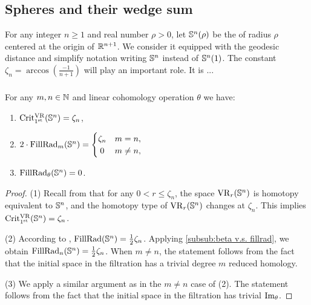 
\subsection{Spheres and their wedge sum }\label{ss:Sn}\label{sub:Sn and wedge sum}

For any integer $n \geq 1$ and real number $\rho > 0$, let $\mathbb{S}^n(\rho)$ be the  of radius $\rho$ centered at the origin of $\mathbb{R}^{n+1}$.
We consider it equipped with the geodesic distance and simplify notation writing \(\mathbb{S}^n\) instead of \(\mathbb{S}^n(1)\).
The constant \(\zeta_n = \arccos(\tfrac{-1}{n+1})\) will play an important role.
It is ... 

\subsubsection{}
\label{subsub:critical values of Sn}
\medskip\proposition
For any $m,n \in \mathbb{N}$ and linear cohomology operation $\theta$ we have:
\begin{enumerate}
	\item \(\operatorname{Crit^{\mathrm{VR}}_{1^{\mathrm{st}}}}(\mathbb{S}^n) = \zeta_n\),
	\item \(2\cdot\firstdeath{m}{\bS^n} =
	\begin{cases}
		\zeta_n & m = n, \\
		\hfil 0 & m \neq n,
	\end{cases}\)
	\item \(\operatorname{FillRad}_{\theta}(\mathbb{S}^n) = 0\).
\end{enumerate}
\begin{proof}
	(1) Recall from \cite[Thm.~7.1]{lim2020vietoris} that for any $0 < r \leq \zeta_n$, the space $\mathrm{VR}_r(\mathbb{S}^n)$ is homotopy equivalent to $\mathbb{S}^n$, and the homotopy type of $\mathrm{VR}_r(\mathbb{S}^n)$ changes at $\zeta_n$.
	This implies $\operatorname{Crit^{\mathrm{VR}}_{1^{\mathrm{st}}}}(\mathbb{S}^n)=\zeta_n$.

	(2) According to \cite{katz1983filling}, \(\mathrm{FillRad}(\mathbb{S}^n) = \frac{1}{2}\zeta_n\).
	Applying \cref{subsub:beta v.s. fillrad}, we obtain \(\operatorname{FillRad}_{n}(\mathbb{S}^n) = \frac{1}{2}\zeta_n\).
    When $m\neq n$, the statement follows from the fact that the initial space in the filtration has a trivial degree $m$ reduced homology.

	(3) We apply a similar argument as in the $m\neq n$ case of (2). The statement follows from the fact that the initial space in the filtration has trivial $\operatorname{Im}_\theta$.
\end{proof}

